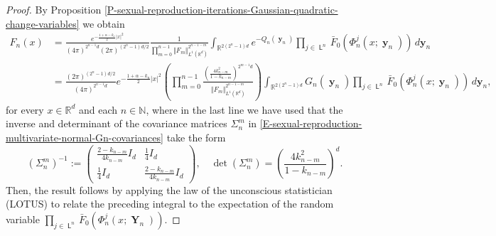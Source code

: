 \documentclass[reqno]{amsart}
\DeclareMathOperator{\Leaves}{\mathsf{L}}
\DeclareMathOperator{\by}{\mathbf{y}}
\DeclareMathOperator{\bY}{\mathbf{Y}}
\numberwithin{equation}{section}
\begin{document}
{\begin{proof}
By Proposition \ref{P-sexual-reproduction-iterations-Gaussian-quadratic-change-variables} we obtain
\begin{align*}
F_n(x)&=\frac{e^{-\frac{1+\alpha-k_n}{2}\vert x\vert^2}}{(4\pi)^{2^{n-1}d}(2\pi)^{(2^n-1)d/2}}\frac{1}{\prod_{m=0}^{n-1}\Vert F_m\Vert_{L^1(\mathbb{R}^d)}^{2^{n-1-m}}}\int_{\mathbb{R}^{2(2^n-1)d}}e^{-Q_n(\by_n)}\prod_{j\in \Leaves^n}\bar{F}_0(\Phi_n^j(x;\by_n))\,d\mathbf{y}_n\\
&=\frac{(2\pi)^{(2^n-1)d/2}}{(4\pi)^{2^{n-1}d}}e^{-\frac{1+\alpha-k_n}{2}\vert x\vert^2}\left(\prod_{m=0}^{n-1}\frac{\left(\frac{4k_{n-m}^2}{1-k_{n-m}}\right)^{2^{m-1}d}}{\Vert F_m\Vert_{L^1(\mathbb{R}^d)}^{2^{n-1-m}}}\right)\int_{\mathbb{R}^{2(2^n-1)d}}G_n(\by_n)\prod_{j\in \Leaves^n}\bar{F}_0(\Phi_n^j(x;\by_n))\,d\mathbf{y}_n,
\end{align*}
for every $x\in \mathbb{R}^d$ and each $n\in \mathbb{N}$, where in the last line we have used that the inverse and determinant of the covariance matrices $\Sigma_n^m$ in \eqref{E-sexual-reproduction-multivariate-normal-Gn-covariances} take the form
$$
(\Sigma_n^m)^{-1}:=\left(\begin{array}{cc}
\displaystyle\frac{2-k_{n-m}}{4 k_{n-m}} I_d & \displaystyle\frac{1}{4}I_d\\
\displaystyle\frac{1}{4}I_d & \displaystyle\frac{2-k_{n-m}}{4 k_{n-m}} I_d
\end{array}\right),\quad \det(\Sigma_n^m)=\left(\frac{4 k_{n-m}^2}{1-k_{n-m}}\right)^d.
$$
Then, the result follows by applying the law of the unconscious statistician (LOTUS) to relate the preceding integral to the expectation of the random variable $\prod_{j\in \Leaves^n}\bar{F}_0(\Phi_n^j(x;\bY_n))$.
\end{proof}

}
\end{document}
